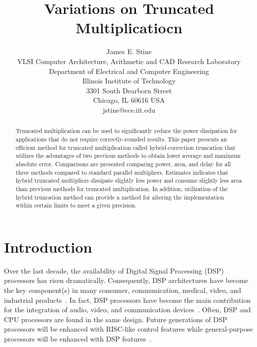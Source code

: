 
\usepackage{epsfig}






\title{Variations on Truncated Multiplicatiocn}
\author{\large James E. Stine \\
VLSI Computer Architecture, Arithmetic and CAD Research Laboratory \\
Department of Electrical and Computer Engineering \\
Illinois Institute of Technology \\
3301 South Dearborn Street \\
Chicago, IL 60616 USA\\
jstine@ece.iit.edu}


\maketitle
\thispagestyle{empty}

\begin{abstract}

Truncated multiplication can be used to significantly reduce the power
dissipation for applications that do not require correctly-rounded
results.  This paper presents
an efficient method for truncated multiplication called hybrid-correction
truncation that utilizes the advantages of two previous methods
to obtain lower average and maximum absolute error.
Comparisons are presented comparing power, area, and delay for all
three methods compared to standard parallel multipliers.  Estimates
indicates that hybrid truncated multipliers dissipate slightly 
less power and
consume slightly less area than previous methods for truncated multiplication.
In addition, utilization of the hybrid truncation method can provide a
method for altering the implementation within certain limits to meet a
given precision.
\end{abstract}

\pagestyle{empty}
\section{Introduction}

Over the last decade, the availability of 
Digital Signal Processing (DSP) processors
has risen dramatically.
Consequently, DSP architectures
have become the key component(s) in many
consumer, communication, medical, video, and industrial
products~\cite{ahmed}.  In fact, DSP processors have become the
main contribution for the integration of audio, video, and
communication
devices~\cite{gagnaire}.  
Often, DSP and CPU processors are found in the same 
design.  Future generations of DSP processors will be enhanced
with RISC-like control features while general-purpose 
processors will be enhanced with DSP features~\cite{eyre2}.

